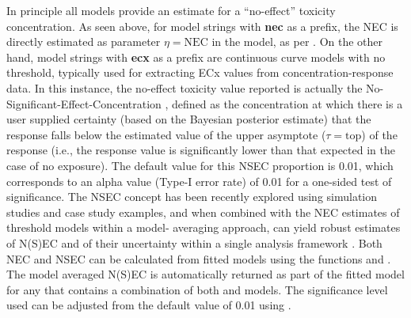 \documentclass[
  shortnames]{jss}
\begin{document}
In principle all models provide an estimate for a ``no-effect'' toxicity concentration. As seen above, for model strings with \textbf{nec} as a prefix, the NEC is directly estimated as parameter \(\eta = \text{NEC}\) in the model, as per \citet{Fox2010}. On the other hand, model strings with \textbf{ecx} as a prefix are continuous curve models with no threshold, typically used for extracting ECx values from concentration-response data. In this instance, the no-effect toxicity value reported is actually the No-Significant-Effect-Concentration \citep[NSEC, see details in][]{Fisher2023}, defined as the concentration at which there is a user supplied certainty (based on the Bayesian posterior estimate) that the response falls below the estimated value of the upper asymptote (\(\tau = \text{top}\)) of the response (i.e., the response value is significantly lower than that expected in the case of no exposure). The default value for this NSEC proportion is 0.01, which corresponds to an alpha value (Type-I error rate) of 0.01 for a one-sided test of significance. The NSEC concept has been recently explored using simulation studies and case study examples, and when combined with the NEC estimates of threshold models within a model‐
averaging approach, can yield robust estimates of N(S)EC and of their uncertainty within a single
analysis framework \citep{fisher2023ieam}. Both NEC and NSEC can be calculated from fitted models using the functions  and . The model averaged N(S)EC is automatically returned as part of the fitted model for any  that contains a combination of both  and  models. The significance level used can be adjusted from the default value of 0.01 using .
\end{document}
